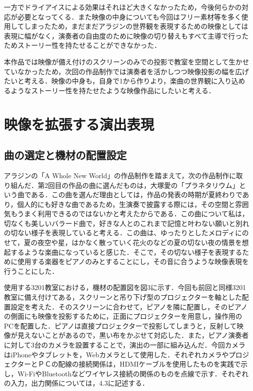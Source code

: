 \documentclass[submit,techrep,noauthor]{ipsj}
\begin{document}
一方でドライアイスによる効果はそれほど大きくなかったため，今後何らかの対応が必要となってくる．また映像の中身についても今回はフリー素材等を多く使用してしまったため，まだまだアラジンの世界観を表現するための映像としては表現に幅がなく，演奏者の自由度のために映像の切り替えもすべて主導で行ったためストーリー性を持たせることができなかった．

本作品では映像が備え付けのスクリーンのみでの投影で教室を空間として生かせていなかったため，次回の作品制作では演奏者を活かしつつ映像投影の幅を広げたいと考える．映像の中身も，自身で1から作りより，楽曲の世界観に入り込めるようなストーリー性を持たせたような映像作品にしたいと考える．


\section{映像を拡張する演出表現}
\subsection{曲の選定と機材の配置設定}
アラジンの「A Whole New World」の作品制作を踏まえて，次の作品制作に取り組んだ．第2回目の作品の曲に選んだものは，大塚愛の「プラネタリウム」という曲である\cite{Planetarium}．この曲を選んだ理由としては，作品の発表の時期が夏終わりであり，個人的にも好きな曲であるため，生演奏で披露する際には，その空間と雰囲気もうまく利用できるのではないかと考えたからである．この曲について私は，切なくも美しいバラード曲で，好きな人とのこれまで記憶と叶わない願いと別れの切ない様子を表現していると考える．この曲は、ゆったりとしたメロディにのせて，夏の夜空や星，はかなく散っていく花火のなどの夏の切ない夜の情景を想起するような楽曲になっていると感じた．そこで，その切ない様子を表現するために使用する楽器をピアノのみとすることにし，その音に合うような映像表現を行うことにした．

使用する3201教室における，機材の配置図を図3に示す．今回も前回と同様3201教室に備え付けてある，スクリーンと吊り下げ型のプロジェクターを軸とした配置設定を考えた．そのスクリーンに合わせて，ピアノを隣に配置し，そのピアノの側面にも映像を投影するために，正面にプロジェクターを用意し，操作用のPCを配置した．ピアノは直接プロジェクターで投影してしまうと，反射して映像が見えないことがあるので，黒い布をかぶせて対応した．また，ピアノ演奏者に対して3台のカメラを設置することで，演出の一部に組み込んだ．今回カメラはiPhoneやタブレットを，Webカメラとして使用した．それぞれカメラやプロジェクターとＰＣの配線の接続関係は，HDMIケーブルを使用したものを実践で示し，Wi-FiやBluetoothなどワイヤレス接続の関係のものを点線で示す．それぞれの入力，出力関係については，4.3に記述する．
\end{document}
